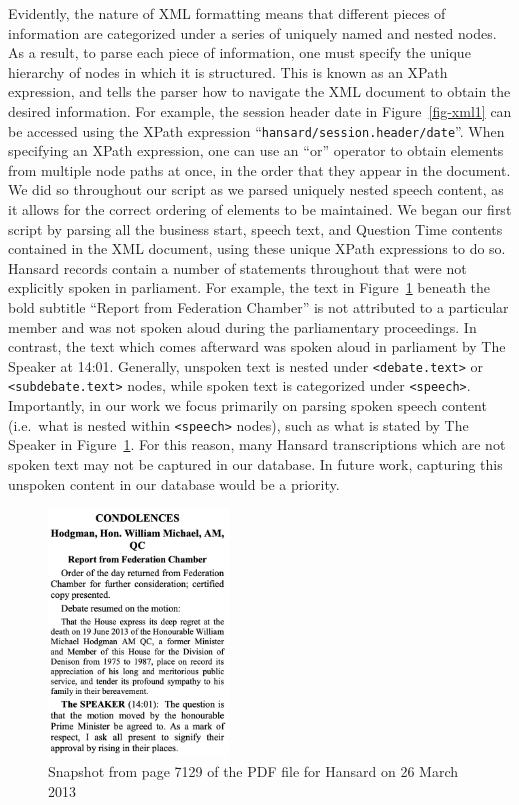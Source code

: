 \documentclass[
  letterpaper,
  DIV=11,
  numbers=noendperiod]{scrartcl}
\begin{document}
Evidently, the nature of XML formatting means that different pieces of
information are categorized under a series of uniquely named and nested
nodes. As a result, to parse each piece of information, one must specify
the unique hierarchy of nodes in which it is structured. This is known
as an XPath expression, and tells the parser how to navigate the XML
document to obtain the desired information. For example, the session
header date in Figure~\ref{fig-xml1} can be accessed using the XPath
expression ``\texttt{hansard/session.header/date}''. When specifying an
XPath expression, one can use an ``or'' operator to obtain elements from
multiple node paths at once, in the order that they appear in the
document. We did so throughout our script as we parsed uniquely nested
speech content, as it allows for the correct ordering of elements to be
maintained. We began our first script by parsing all the business start,
speech text, and Question Time contents contained in the XML document,
using these unique XPath expressions to do so. Hansard records contain a
number of statements throughout that were not explicitly spoken in
parliament. For example, the text in Figure~\ref{fig-content_ex} beneath
the bold subtitle ``Report from Federation Chamber'' is not attributed
to a particular member and was not spoken aloud during the parliamentary
proceedings. In contrast, the text which comes afterward was spoken
aloud in parliament by The Speaker at 14:01. Generally, unspoken text is
nested under \texttt{\textless{}debate.text\textgreater{}} or
\texttt{\textless{}subdebate.text\textgreater{}} nodes, while spoken
text is categorized under \texttt{\textless{}speech\textgreater{}}.
Importantly, in our work we focus primarily on parsing spoken speech
content (i.e.~what is nested within
\texttt{\textless{}speech\textgreater{}} nodes), such as what is stated
by The Speaker in Figure~\ref{fig-content_ex}. For this reason, many
Hansard transcriptions which are not spoken text may not be captured in
our database. In future work, capturing this unspoken content in our
database would be a priority.

\begin{figure}

{\centering \includegraphics[width=1.88542in,height=\textheight]{images/content_ex.png}

}

\caption{\label{fig-content_ex}Snapshot from page 7129 of the PDF file
for Hansard on 26 March 2013}

\end{figure}
\end{document}
